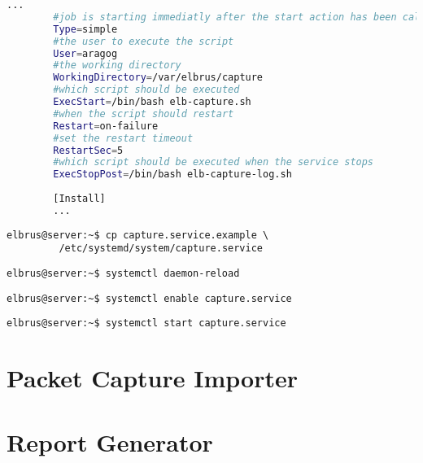 \documentclass{article}
\begin{document}
	\begin{lstlisting}[caption={capture.service.example - Die Variable 'WorkingDirectory', Die Variable 'User' sowie die Variable 'ExecStopPost' anpassen.},language=bash ,keywords={WorkingDirectory, User, ExecStopPost}, keywordstyle=\color{red}, firstnumber=3]
		...
		#job is starting immediatly after the start action has been called
		Type=simple
		#the user to execute the script
		User=aragog
		#the working directory
		WorkingDirectory=/var/elbrus/capture
		#which script should be executed
		ExecStart=/bin/bash elb-capture.sh
		#when the script should restart
		Restart=on-failure
		#set the restart timeout
		RestartSec=5
		#which script should be executed when the service stops
		ExecStopPost=/bin/bash elb-capture-log.sh
		
		[Install]
		...
	\end{lstlisting}
	
	
	\lstset{style=commands}
	\begin{lstlisting}[caption={Kopieren des Serviceprogrammes}]
		elbrus@server:~$ cp capture.service.example \
		 /etc/systemd/system/capture.service
	\end{lstlisting}

	\begin{lstlisting}[caption={Neuladen des 'systemctl' Deamons}]
		elbrus@server:~$ systemctl daemon-reload
	\end{lstlisting}
	
	\begin{lstlisting}[caption={Aktivieren des Serviceprogrammes}]
		elbrus@server:~$ systemctl enable capture.service
	\end{lstlisting}

	\begin{lstlisting}[caption={Starten des Serviceprogrammes}]
		elbrus@server:~$ systemctl start capture.service
	\end{lstlisting}
	
	\newpage
	
	
	\section{Packet Capture Importer}
	\newpage
	
	\section{Report Generator}
	\newpage
	
\end{document}
